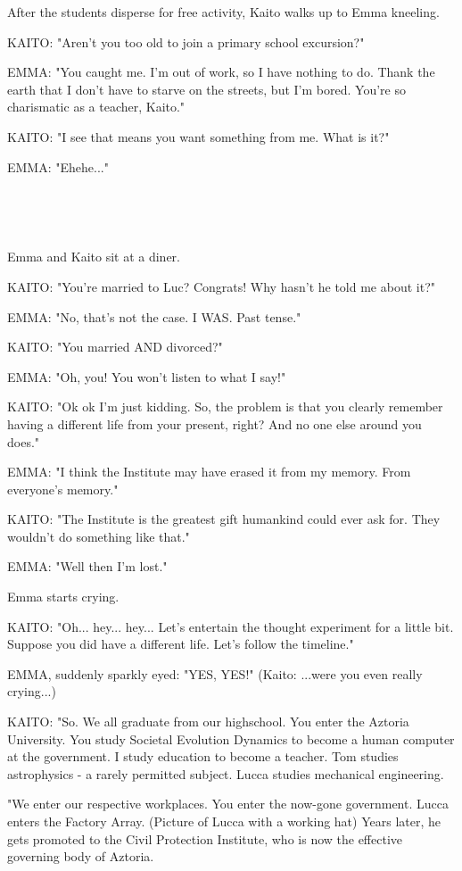 \documentclass[11pt]{article}
\begin{document}
After the students disperse for free activity, Kaito walks up to Emma kneeling.

KAITO: "Aren't you too old to join a primary school excursion?"

EMMA: "You caught me. 
I'm out of work, so I have nothing to do. 
Thank the earth that I don't have to starve on the streets, but I'm bored.
You're so charismatic as a teacher, Kaito."

KAITO: "I see that means you want something from me. 
What is it?"

EMMA: "Ehehe..."

\ 

\ 

Emma and Kaito sit at a diner.

KAITO: "You're married to Luc? Congrats! Why hasn't he told me about it?"

EMMA: "No, that's not the case. 
I WAS. Past tense."

KAITO: "You married AND divorced?"

EMMA: "Oh, you! You won't listen to what I say!"

KAITO: "Ok ok I'm just kidding.
So, the problem is that you clearly remember having a different life from your present, right?
And no one else around you does."

EMMA: "I think the Institute may have erased it from my memory.
From everyone's memory."

KAITO: "The Institute is the greatest gift humankind could ever ask for.
They wouldn't do something like that."

EMMA: "Well then I'm lost."

Emma starts crying.

KAITO: "Oh... hey... hey...
Let's entertain the thought experiment for a little bit.
Suppose you did have a different life. 
Let's follow the timeline."

EMMA, suddenly sparkly eyed: "YES, YES!"
(Kaito: ...were you even really crying...)

KAITO: "So. 
We all graduate from our highschool. 
You enter the Aztoria University.
You study Societal Evolution Dynamics to become a human computer at the government.
I study education to become a teacher.
Tom studies astrophysics - a rarely permitted subject.
Lucca studies mechanical engineering.

"We enter our respective workplaces. 
You enter the now-gone government.
Lucca enters the Factory Array. (Picture of Lucca with a working hat)
Years later, he gets promoted to the Civil Protection Institute, who is now the effective governing body of Aztoria.
\end{document}
